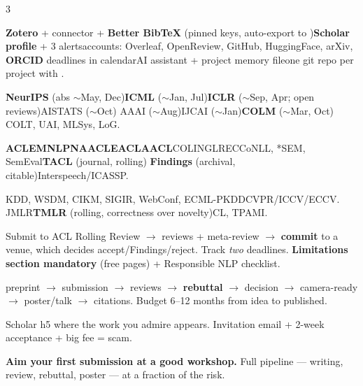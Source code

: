 \documentclass[10pt,a4paper]{article}
\begin{document}
\vspace{2pt}
\begin{multicols}{3}
\raggedright


\textbf{Zotero} + connector + \textbf{Better BibTeX} (pinned keys, auto-export
to )\dt \textbf{Scholar profile} + 3 alerts\dt accounts:
Overleaf, OpenReview, GitHub, HuggingFace, arXiv, \textbf{ORCID}\dt
deadlines in calendar\dt AI assistant + project memory file\dt one git repo
per project with .

\textbf{NeurIPS} (abs $\sim$May, Dec)\dt \textbf{ICML} ($\sim$Jan,
Jul)\dt \textbf{ICLR} ($\sim$Sep, Apr; open reviews)\dt AISTATS ($\sim$Oct)\dt
AAAI ($\sim$Aug)\dt IJCAI ($\sim$Jan)\dt \textbf{COLM} ($\sim$Mar, Oct)\dt
COLT, UAI, MLSys, LoG.

\textbf{ACL}\dt \textbf{EMNLP}\dt \textbf{NAACL}\dt\textbf{EACL}\dt\textbf{AACL}\dt COLING\dt LREC\dt CoNLL, *SEM, SemEval\dt \textbf{TACL} (journal, rolling)\dt
\textbf{Findings} (archival, citable)\dt Interspeech/ICASSP.

KDD, WSDM, CIKM, SIGIR, WebConf, ECML-PKDD\dt CVPR/ICCV/ECCV.
JMLR\dt \textbf{TMLR} (rolling, correctness over novelty)\dt CL,
TPAMI.

Submit to ACL Rolling Review $\to$ reviews + meta-review $\to$
\textbf{commit} to a venue, which decides accept/Findings/reject. Track
\emph{two} deadlines. \textbf{Limitations section mandatory} (free pages) +
Responsible NLP checklist.

preprint $\to$ submission $\to$ reviews $\to$ \textbf{rebuttal}
$\to$ decision $\to$ camera-ready $\to$ poster/talk $\to$ citations. Budget
6--12 months from idea to published.

Scholar h5\dt
{}\dt
{}\dt where the work you admire appears.
Invitation email + 2-week acceptance + big fee = scam.

\begin{flag}
\textbf{Aim your first submission at a good workshop.} Full pipeline ---
writing, review, rebuttal, poster --- at a fraction of the risk.
\end{flag}


\end{multicols}
\end{document}
